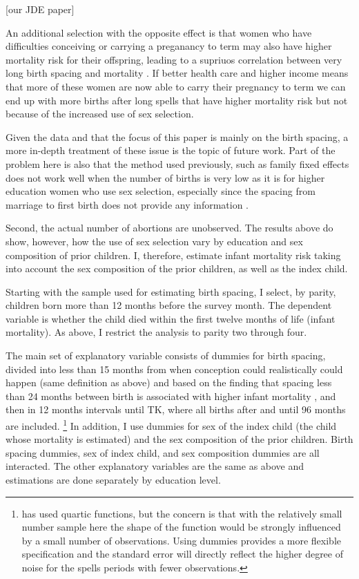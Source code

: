[our JDE paper]

An additional selection with the opposite effect is that women who have
difficulties conceiving or carrying a preganancy to term may also have higher 
mortality risk for their offspring, leading to a supriuos correlation
between very long birth spacing and mortality \citep{Kozuki2013}. 
If better health care and higher income means that more of these women are
now able to carry their pregnancy to term we can end up with more births
after long spells that have higher mortality risk but not because of the
increased use of sex selection.


Given the data and that the focus of this paper is mainly on the birth
spacing, a more in-depth treatment of these issue is the topic of future work.
Part of the problem here is also that the method used previously, such
as family fixed effects does not work well when the number of births is
very low as it is for higher education women who use sex 
selection, especially since the spacing from marriage to first birth
does not provide any information \citep{Kozuki2013,Molitoris2019}.

Second, the actual number of abortions are unobserved.
The results above do show, however, how the use of sex selection vary
by education and sex composition of prior children.
I, therefore, estimate infant mortality risk taking into account the
sex composition of the prior children, as well as the index child.

Starting with the sample used for estimating birth spacing, I select, by
parity, children born more than 12 months before the survey month.
The dependent variable is whether the child died within the first twelve
months of life (infant mortality).
As above, I restrict the analysis to parity two through four.

The main set of explanatory variable consists of dummies for birth spacing,
divided into less than 15 months from when conception could realistically
could happen (same definition as above) and based on the finding that 
spacing less than 24 months between birth is associated with higher
infant mortality \citep{Molitoris2019}, and then in 12 months intervals
until TK, where all births after and until 96 months are included.%
\footnote{
\citet{Molitoris2019} has used quartic functions, but the concern is
that with the relatively small number sample here the shape
of the function would be strongly influenced by a small number of
observations.
Using dummies provides a more flexible specification and the standard
error will directly reflect the higher degree of noise for the
spells periods with fewer observations.
}
In addition, I use dummies for sex of the index child (the child whose 
mortality is estimated) and the sex composition of the prior children.
Birth spacing dummies, sex of index child, and sex composition dummies
are all interacted.
The other explanatory variables are the same as above and estimations
are done separately by education level.

